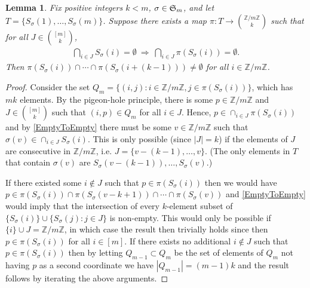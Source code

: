 \documentclass[journal, onecolumn]{IEEEtran}
\newtheorem{lemma}{Lemma}
\begin{document}

\begin{lemma}\label{NonEmptyLemma} Fix positive integers $k < m$, $\sigma \in \frak{S}_m$, and let $T = \{S_\sigma(1), \ldots, S_\sigma(m)\}$. Suppose there exists a map $\pi: T \to {\mathbb{Z}/m\mathbb{Z} \choose k}$ such that for all $J \in {[m] \choose k}$,
\begin{align}\label{EmptyToEmpty}
 \bigcap_{i \in J} S_\sigma(i) = \emptyset \ \Longrightarrow \ \bigcap_{i \in J} \pi(S_\sigma(i)) = \emptyset.
\end{align}
%
Then  $\pi(S_\sigma(i)) \cap \cdots \cap \pi(S_\sigma(i+(k-1))) \neq \emptyset$ for all $i \in \mathbb{Z}/m\mathbb{Z}$.
\end{lemma}

\begin{proof} Consider the set $Q_m = \{ (i,j) : i \in \mathbb{Z}/m\mathbb{Z}, j \in \pi(S_\sigma(i)) \}$, which has $mk$ elements. By the pigeon-hole principle, there is some $p \in \mathbb{Z}/m\mathbb{Z}$ and $J \in {[m] \choose k}$ such that $(i, p) \in Q_m$ for all $i \in J$. Hence, $p \in \cap_{i \in J} \pi(S_\sigma(i))$ and by \eqref{EmptyToEmpty} there must be some $v \in \mathbb{Z}/m\mathbb{Z}$ such that $\sigma(v) \in \cap_{i \in J} S_\sigma(i)$. This is only possible (since $|J| = k$) if the elements of $J$ are consecutive in $\mathbb{Z}/m\mathbb{Z}$, i.e. $J = \{v - (k-1), \ldots, v\}$. (The only elements in $T$ that contain $\sigma(v)$ are $S_\sigma(v-(k-1)), \ldots, S_\sigma(v)$.)

If there existed some $i \notin J$ such that $p \in \pi(S_\sigma(i))$ then we would have $p \in \pi(S_\sigma(i)) \cap \pi(S_\sigma(v - k+1)) \cap \cdots \cap \pi(S_\sigma(v))$ and \eqref{EmptyToEmpty} would imply that the intersection of every $k$-element subset of $\{S_\sigma(i)\} \cup \{S_\sigma(j): j \in J\}$ is non-empty. This would only be possible if $\{i\} \cup J = \mathbb{Z}/m\mathbb{Z}$, in which case the result then trivially holds since then $p \in \pi(S_\sigma(i))$ for all $i \in [m]$. If there exists no additional $i \notin J$ such that $p \in \pi(S_\sigma(i))$ then by letting $Q_{m-1} \subset Q_m$ be the set of elements of $Q_m$ not having $p$ as a second coordinate we have $|Q_{m-1}| = (m-1)k$ and the result follows by iterating the above arguments.
\end{proof}

\end{document}
